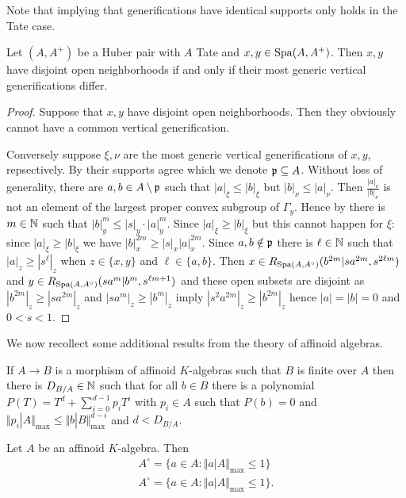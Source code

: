 \begin{remark}
    Note that  implying that generifications have identical supports only holds in the Tate case. 
\end{remark}
\begin{proposition}
    Let $(A,A^{+})$ be a Huber pair with $A$ Tate and $x,y\in\mathrm{Spa}(A,A^{+})$. Then $x,y$ have disjoint open neighborhoods if and only if their most generic vertical generifications differ.
\end{proposition}
\begin{proof}
    Suppose that $x,y$ have disjoint open neighborhoods. Then they obviously cannot have a common vertical generification. 

    Conversely suppose $\xi,\nu$ are the most generic vertical generifications of $x,y$, repsectively. By  their supports agree which we denote $\mathfrak{p}\subseteq A$. Without loss of generality, there are $a,b\in A\setminus\mathfrak{p}$ such that $|a|_{\xi}\leq|b|_{\xi}$ but $|b|_{\nu}\leq |a|_{\nu}$. Then $\frac{|a|_{\nu}}{|b|_{\nu}}$ is not an element of the largest proper convex subgroup of $\Gamma_{y}$. Hence by  there is $m\in\mathbb{N}$ such that $|b|_{y}^{m}\leq |s|_{y}\cdot|a|_{y}^{m}$. Since $|a|_{\xi}\geq|b|_{\xi}$ but this cannot happen for $\xi$: since $|a|_{\xi}\geq |b|_{\xi}$ we have $|b|_{x}^{2m}\geq|s|_{x}|a|^{2m}_{x}$. Since $a,b\notin\mathfrak{p}$ there is $\ell\in\mathbb{N}$ such that $|a|_{z}\geq|s^{\ell}|_{z}$ when $z\in\{x,y\}$ and $\ell\in \{a,b\}$. Then $x\in R_{\mathrm{Spa}(A,A^{\circ})}(b^{2m}|sa^{2m},s^{2\ell m})$ and $y\in R_{\mathrm{Spa}(A,A^{\circ})}(sa^{m}|b^{m},s^{\ell m+1})$ and these open subsets are disjoint as $|b^{2m}|_{z}\geq|sa^{2m}|_{z}$ and $|sa^{m}|_{z}\geq|b^{m}|_{z}$ imply $|s^{2}a^{2m}|_{z}\geq|b^{2m}|_{z}$ hence $|a|=|b|=0$ and $0<s<1$.
\end{proof}
We now recollect some additional results from the theory of affinoid algebras. 
\begin{proposition}
    If $A\to B$ is a morphism of affinoid $K$-algebras such that $B$ is finite over $A$ then there is $D_{B/A}\in\mathbb{N}$ such that for all $b\in B$ there is a polynomial $P(T)=T^{d}+\sum_{i=0}^{d-1}p_{i}T^{i}$ with $p_{i}\in A$ such that $P(b)=0$ and $\Vert p_{i}|A\Vert_{\max}\leq\Vert b|B\Vert^{d-i}_{\max}$ and $d<D_{B/A}$. 
\end{proposition}
\begin{corollary}
    Let $A$ be an affinoid $K$-algebra. Then 
    \begin{align*}
        A^{\circ}=\{a\in A:\Vert a|A\Vert_{\max}\leq 1\} \\
        A^{\circ}=\{a\in A:\Vert a|A\Vert_{\max}\leq 1\}.
    \end{align*}
\end{corollary}
